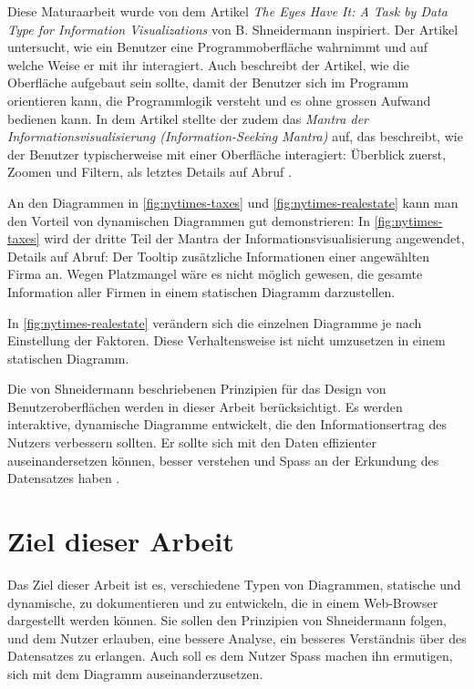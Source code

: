 
Diese Maturaarbeit wurde von dem Artikel \textit{The Eyes Have It: A Task by Data Type for Information Visualizations} von B. Shneidermann \cite{shneiderman} inspiriert. Der Artikel untersucht, wie ein Benutzer eine Programmoberfläche wahrnimmt und auf welche Weise er mit ihr interagiert. Auch beschreibt der Artikel, wie die Oberfläche aufgebaut sein sollte, damit der Benutzer sich im Programm orientieren kann, die Programmlogik versteht und es ohne grossen Aufwand bedienen kann. In dem Artikel stellte der zudem das \textit{Mantra der Informationsvisualisierung (Information-Seeking Mantra)} auf, das beschreibt, wie der Benutzer typischerweise mit einer Oberfläche interagiert: Überblick zuerst, Zoomen und Filtern, als letztes Details auf Abruf \cite{shneiderman}.

An den Diagrammen in \ref{fig:nytimes-taxes} und \ref{fig:nytimes-realestate} kann man den Vorteil von dynamischen Diagrammen gut demonstrieren: In \ref{fig:nytimes-taxes} wird der dritte Teil der Mantra der Informationsvisualisierung angewendet, Details auf Abruf: Der Tooltip zusätzliche Informationen einer angewählten Firma an. Wegen Platzmangel wäre es nicht möglich gewesen, die gesamte Information aller Firmen in einem statischen Diagramm darzustellen.

In \ref{fig:nytimes-realestate} verändern sich die einzelnen Diagramme je nach Einstellung der Faktoren. Diese Verhaltensweise ist nicht umzusetzen in einem statischen Diagramm.

Die von Shneidermann beschriebenen Prinzipien für das Design von Benutzeroberflächen werden in dieser Arbeit berücksichtigt. Es werden interaktive, dynamische Diagramme entwickelt, die den Informationsertrag des Nutzers verbessern sollten. Er sollte sich mit den Daten effizienter auseinandersetzen können, besser verstehen und Spass an der Erkundung des Datensatzes haben \cite{shneiderman}.

\section{Ziel dieser Arbeit}

Das Ziel dieser Arbeit ist es, verschiedene Typen von Diagrammen, statische und dynamische, zu dokumentieren und zu entwickeln, die in einem Web-Browser dargestellt werden können. Sie sollen den Prinzipien von Shneidermann folgen, und dem Nutzer erlauben, eine bessere Analyse, ein besseres Verständnis über des Datensatzes zu erlangen. Auch soll es dem Nutzer Spass machen ihn ermutigen, sich mit dem Diagramm auseinanderzusetzen.

